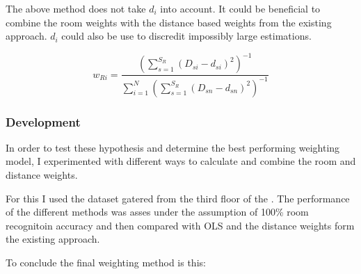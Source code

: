 The above method does not take \(d_i\) into account. It could be beneficial to combine the room weights with the distance based weights from the existing approach. \(d_i\) could also be use to discredit impossibly large estimations.

\begin{equation}
w_{Ri}=\frac{(\sum_{s=1}^{S_R}{(D_{si}-d_{si})^2})^{-1}}{\sum_{i=1}^{N}{(\sum_{s=1}^{S_R}{(D_{sn}-d_{sn})^2})^{-1}}}
\end{equation}


\subsubsection{Development}
\label{WeightingModelDefinition}

In order to test these hypothesis and determine the best performing weighting model, I experimented with different ways to calculate and combine the room and distance weights.

For this I used the dataset gatered from the third floor of the . The performance of the different methods was asses under the assumption of 100\% room recognitoin accuracy and then compared with OLS and the distance weights form the existing approach.


To conclude the final weighting method is this:

